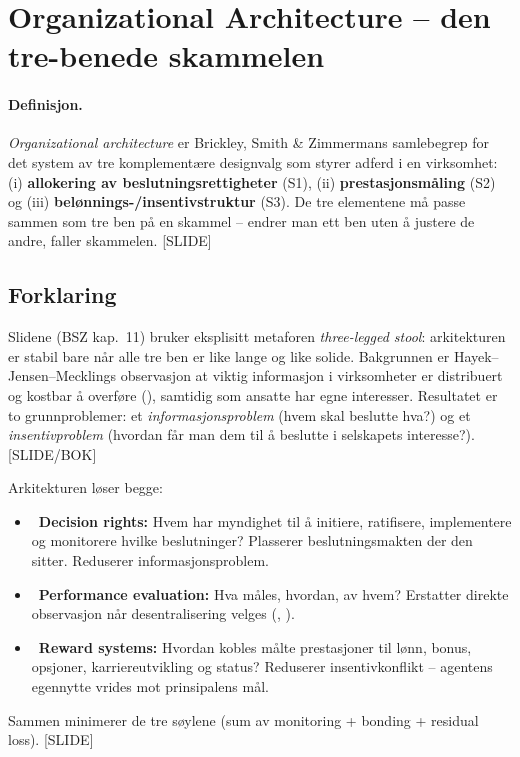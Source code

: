 \section{Organizational Architecture -- den tre-benede skammelen}\label{thr:organizational-architecture}

\paragraph{Definisjon.} \emph{Organizational architecture} er Brickley, Smith \& Zimmermans samlebegrep for det system av tre komplementære designvalg som styrer adferd i en virksomhet: (i) \textbf{allokering av beslutningsrettigheter} (S1), (ii) \textbf{prestasjonsmåling} (S2) og (iii) \textbf{belønnings-/insentivstruktur} (S3). De tre elementene må passe sammen som tre ben på en skammel -- endrer man ett ben uten å justere de andre, faller skammelen. [SLIDE]

\subsection*{Forklaring}

Slidene (BSZ kap.\ 11) bruker eksplisitt metaforen \emph{three-legged stool}: arkitekturen er stabil bare når alle tre ben er like lange og like solide. Bakgrunnen er Hayek--Jensen--Mecklings observasjon at viktig informasjon i virksomheter er distribuert og kostbar å overføre (), samtidig som ansatte har egne interesser. Resultatet er to grunnproblemer: et \emph{informasjonsproblem} (hvem skal beslutte hva?) og et \emph{insentivproblem} (hvordan får man dem til å beslutte i selskapets interesse?). [SLIDE/BOK]

Arkitekturen løser begge:
\begin{itemize}
\item \SOne\ \textbf{Decision rights:} Hvem har myndighet til å initiere, ratifisere, implementere og monitorere hvilke beslutninger? Plasserer beslutningsmakten der den  sitter. Reduserer informasjonsproblem.
\item \STwo\ \textbf{Performance evaluation:} Hva måles, hvordan, av hvem? Erstatter direkte observasjon når desentralisering velges (, ).
\item \SThree\ \textbf{Reward systems:} Hvordan kobles målte prestasjoner til lønn, bonus, opsjoner, karriereutvikling og status? Reduserer insentivkonflikt -- agentens egennytte vrides mot prinsipalens mål.
\end{itemize}
Sammen minimerer de tre søylene  (sum av monitoring + bonding + residual loss). [SLIDE]

